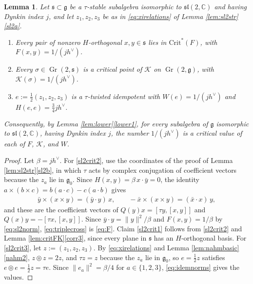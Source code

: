 \documentclass[leqno,10pt]{amsart}
\newtheorem{lemma}[theorem]{Lemma}%
\theoremstyle{definition}
\numberwithin{equation}{section}
\newcommand{\grass}{\operatorname{Gr}}
\newcommand{\sect}{\mathscr{K}}
\newcommand{\tmlt}{\circledcirc}
\newcommand{\sll}{\mathfrak{sl}}
\newcommand{\g}{\mathfrak{g}}
\newcommand{\com}{\mathbb C}
\newcommand{\gz}{\g_{0}}
\newcommand{\crtnt}{\mathrm{Crit}^*}
\newcommand{\hv}{h^\vee}
\newcommand{\norm}[1]{\lVert #1\rVert}
\newcommand{\subs}{\mathfrak{s}}
\newcommand{\qad}{Q}
\begin{document}
\begin{lemma}\label{thm:sl2crit}
Let $\subs \subset \g$ be a $\tau$-stable subalgebra isomorphic to $\sll(2, \com)$ and having Dynkin index $j$, and let $z_{1}, z_{2}, z_{3}$ be as in \eqref{eq:xirelations} of Lemma \ref{lem:sl2str}\ref{sl2a}.
\begin{enumerate}[label=(\arabic*), ref=(\arabic*)]
\item\label{sl2crit2} Every pair of nonzero $H$-orthogonal $x, y \in \subs$ lies in $\crtnt(F)$, with $F(x, y) = 1/(j\hv)$.
\item\label{sl2crit1} Every $\sigma \in \grass(2, \subs)$ is a critical point of $\sect$ on $\grass(2, \g)$, with $\sect(\sigma) = 1/(j\hv)$.
\item\label{sl2crit3} $e := \tfrac{1}{2}(z_{1}, z_{2}, z_{3})$ is a $\tau$-twisted idempotent with $W(e) = 1/(j\hv)$ and $H(e, e) = \tfrac{3}{4}j\hv$.
\end{enumerate}
Consequently, by Lemma \ref{lem:lower}\ref{lower1}, for every subalgebra of $\g$ isomorphic to $\sll(2, \com)$, having Dynkin index $j$, the number $1/(j\hv)$ is a critical value of each of $F$, $\sect$, and $W$.
\end{lemma}
\begin{proof}
Let $\beta = j\hv$. For \ref{sl2crit2}, use the coordinates of the proof of Lemma \ref{lem:sl2str}\ref{sl2b}, in which $\tau$ acts by complex conjugation of coefficient vectors because the $z_{a}$ lie in $\gz$. Since $H(x, y) = \beta\,x\cdot\bar{y} = 0$, the identity $a \times (b \times c) = b(a \cdot c) - c(a \cdot b)$ gives
\begin{align}\label{eq:triplecross}
\bar{y}\times(x \times y) = (\bar{y}\cdot y)\,x, \qquad -\bar{x}\times(x \times y) = (\bar{x}\cdot x)\,y,
\end{align}
and these are the coefficient vectors of $\qad(y)x = [\tau y, [x, y]]$ and $\qad(x)y = -[\tau x, [x, y]]$. Since $\bar{y}\cdot y = \norm{y}^{2}/\beta$ and $F(x, y) = 1/\beta$ by \eqref{eq:sl2norm}, \eqref{eq:triplecross} is \eqref{eq:F}. Claim \ref{sl2crit1} follows from \ref{sl2crit2} and Lemma \ref{lem:critFK}\ref{corr3}, since every plane in $\subs$ has an $H$-orthogonal basis. For \ref{sl2crit3}, let $z := (z_{1}, z_{2}, z_{3})$. By \eqref{eq:xirelations} and Lemma \ref{lem:nahmbasic}\ref{nahm2}, $z \tmlt z = 2z$, and $\tau z = z$ because the $z_{a}$ lie in $\gz$, so $e = \tfrac{1}{2}z$ satisfies $e \tmlt e = \tfrac{1}{2}z = \tau e$. Since $\norm{e_{a}}^{2} = \beta/4$ for $a \in \{1, 2, 3\}$, \eqref{eq:idemnorms} gives the values.
\end{proof}
\end{document}
